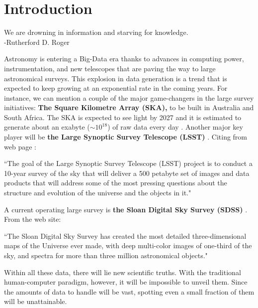 \section{Introduction}

\begin{flushright}
We are drowning in information and starving for knowledge.\\
-Rutherford D. Roger
\end{flushright}

Astronomy is entering a Big-Data era \cite{Moravec2019, Siemiginowska2019, Gunn2006a} thanks to advances in computing power, instrumentation, and new telescopes that are paving the way to large astronomical surveys. This explosion in data generation is a trend that is expected to keep growing at an exponential rate in the coming years. For instance, we can mention a couple of the major game-changers in the large survey initiatives: \textbf{The Square Kilometre Array (SKA),} to be built in Australia and South Africa. The SKA is expected to see light by 2027 and it is estimated to generate about an exabyte ($\sim 10^{18}$) of raw data every day \cite{SKAweb, Philip2019}. Another major key player will be \textbf{the Large Synoptic Survey Telescope (LSST)} \cite{Ivezic2019}. Citing from \cite{LSSTweb} web page : 

``The goal of the Large Synoptic Survey Telescope (LSST) project is to conduct a 10-year survey of the sky that will deliver a 500 petabyte set of images and data products that will address some of the most pressing questions about the structure and evolution of the universe and the objects in it." 

A current operating large survey is \textbf{the Sloan Digital Sky Survey (SDSS)} \cite{Gunn2006a, Weijmans2016}. From the \cite{SDSSweb} web site:

``The Sloan Digital Sky Survey has created the most detailed three-dimensional maps of the Universe ever made, with deep multi-color images of one-third of the sky, and spectra for more than three million astronomical objects."

Within all these data, there will lie new scientific truths. With the traditional human-computer paradigm, however, it will be impossible to unveil them. Since the amounts of data to handle will be vast, spotting even a small fraction of them will be unattainable.


